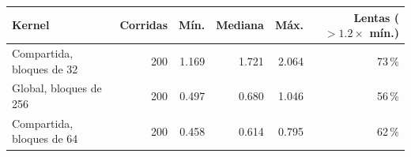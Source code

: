 \begin{tabular}{lrrrrr}
\toprule
Kernel & Corridas & Mín. & Mediana & Máx. & Lentas ($> 1.2\times$ mín.) \\
\midrule
Compartida, bloques de 32 & 200 & 1.169 & 1.721 & 2.064 & 73\,\% \\
Global, bloques de 256 & 200 & 0.497 & 0.680 & 1.046 & 56\,\% \\
Compartida, bloques de 64 & 200 & 0.458 & 0.614 & 0.795 & 62\,\% \\
\bottomrule
\end{tabular}
